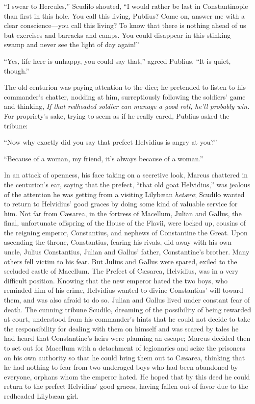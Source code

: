 ``I swear to Hercules,'' Scudilo shouted, ``I would rather be last in Constantinople than first in this hole. You call this living, Publius? Come on, answer me with a clear conscience---you call this living? To know that there is nothing ahead of us but exercises and barracks and camps. You could
disappear in this stinking swamp and never see the light of day again!'' %

``Yes, life here is unhappy, you could say that,'' agreed Publius. ``It is quiet, though.'' %

The old centurion was paying attention to the dice; he pretended to listen to his commander's chatter, nodding at him, surreptiously following the soldiers' game and thinking, \textit{If that redheaded soldier can manage a good roll, he'll probably win.} For propriety's sake, trying to seem as if he really cared, Publius asked the tribune:

``Now why exactly did you say that prefect Helvidius is angry at you?'' %

``Because of a woman, my friend, it's always because of a woman.'' %

In an attack of openness, his face taking on a secretive look, Marcus chattered in the centurion's ear, saying that the prefect, ``that old goat Helvidius,'' was jealous of the attention he was getting from a visiting Lilyb\ae an \textit{het\ae ra}; Scudilo wanted to return to Helvidius' good graces by doing some kind of valuable service for him. Not far from C\ae sarea, in the fortress of Macellum, Julian and Gallus, the final, unfortunate offspring of the House of the Flavii, were locked up, cousins of the reigning emperor, Constantius, and nephews of Constantine the Great. Upon ascending the throne, Constantius, fearing his rivals, did away with his own uncle, Julius Constantius, Julian and Gallus' father, Constantine's brother. Many others fell victim to his fear. But Julius and Gallus were spared, exiled to the secluded castle of Macellum. The Prefect of C\ae sarea, Helvidius, was in a very difficult position. Knowing that the new emperor hated the two boys, who reminded him of his crime, Helvidius wanted to divine Constantius' will toward them, and was also afraid to do so. Julian and Gallus lived under constant fear of death. The cunning tribune Scudilo, dreaming of the possibility of being rewarded at court, understood from his commander's hints that he could not decide to take the responsibility for dealing with them on himself and was scared by tales he had heard that Constantine's heirs were planning an escape; Marcus decided then to set out for Macellum with a detachment of legionaries and seize the prisoners on his own authority so that he could bring them out to C\ae sarea, thinking that he had nothing to fear from two underaged boys who had been abandoned by everyone, orphans whom the emperor hated. He hoped that by this deed he could return to the prefect Helvidius' good graces, having fallen out of favor due to the redheaded Lilyb\ae an girl.

